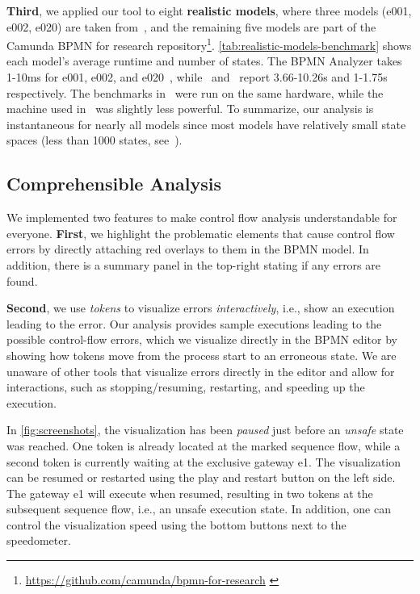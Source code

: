 \documentclass[
onecolumn, %
]{ceurart}
\begin{document}
\textbf{Third}, we applied our tool to eight \textbf{realistic models}, where three models (e001, e002, e020) are taken from~\cite{houhouFirstOrderLogicVerification2022}, and the remaining five models are part of the Camunda BPMN for research repository\footnote{\url{https://github.com/camunda/bpmn-for-research} \label{footnote:camundaResearch}}.
\autoref{tab:realistic-models-benchmark} shows each model's average runtime and number of states.
The BPMN Analyzer takes 1-10ms for e001, e002, and e020~\cite{krauterInstantaneousComprehensibleFixable2024}, while~\cite{houhouFirstOrderLogicVerification2022} and~\cite{krauterHigherorderTransformationApproach2024} report 3.66-10.26s and 1-1.75s respectively.
The benchmarks in~\cite{krauterHigherorderTransformationApproach2024} were run on the same hardware, while the machine used in~\cite{houhouFirstOrderLogicVerification2022} was slightly less powerful.
To summarize, our analysis is instantaneous for nearly all models since most models have relatively small state spaces (less than 1000 states, see~\cite{fahlandAnalysisDemandInstantaneous2011}).

\subsection{Comprehensible Analysis}
We implemented two features to make control flow analysis understandable for everyone. 
\textbf{First}, we highlight the problematic elements that cause control flow errors by directly attaching red overlays to them in the BPMN model.
In addition, there is a summary panel in the top-right stating if any errors are found.

\textbf{Second}, we use \textit{tokens} to visualize errors \textit{interactively}, i.e., show an execution leading to the error.
Our analysis provides sample executions leading to the possible control-flow errors, which we visualize directly in the BPMN editor by showing how tokens move from the process start to an erroneous state.
We are unaware of other tools that visualize errors directly in the editor and allow for interactions, such as stopping/resuming, restarting, and speeding up the execution.

In \autoref{fig:screenshots}, the visualization has been \textit{paused} just before an \textit{unsafe} state was reached.
One token is already located at the marked sequence flow, while a second token is currently waiting at the exclusive gateway \textsf{e1}.
The visualization can be resumed or restarted using the play and restart button on the left side.
The gateway \textsf{e1} will execute when resumed, resulting in two tokens at the subsequent sequence flow, i.e., an unsafe execution state.
In addition, one can control the visualization speed using the bottom buttons next to the speedometer.
\end{document}
